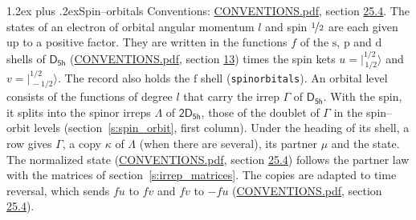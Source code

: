\documentclass[10pt,a4paper]{article}
\makeatletter
\renewcommand\section{\@startsection{section}{1}{\z@}{-3ex plus -1ex minus -.2ex}%
  {1.2ex plus .2ex}{\normalfont\large\sffamily\bfseries\color{parttitle}}}
\numberwithin{equation}{section}
\newcommand{\grp}[1]{\mathsf{#1}}
\newcommand{\orbital}[1]{\mathrm{#1}}
\newcommand{\mult}{\kappa}
\newcommand{\intx}{\mu}
\newcommand{\jm}[2]{\bigl\lvert{}^{#1}_{\,#2}\bigr\rangle}
\makeatother
\begin{document}
\section{Spin--orbitals}\label{s:spin_orbitals}
Conventions: \href{../../CONVENTIONS.pdf}{CONVENTIONS.pdf}, section \href{../../CONVENTIONS.pdf\#conv.25.4}{25.4}.
\leavevmode\label{n:index.orbital.l}The states of an electron of orbital angular momentum $l$ and spin $\nicefrac{1}{2}$ are each given up to a positive factor. \label{n:local.spinor.uv}\label{n:local.function.f}They are written in the functions $f$ of the $\orbital{s}$, $\orbital{p}$ and $\orbital{d}$ shells of \href{../../../rotation/data/pdf/D5h.pdf}{$\grp{D_{5h}}$} (\href{../../CONVENTIONS.pdf}{CONVENTIONS.pdf}, section \href{../../../rotation/CONVENTIONS.pdf\#conv.13}{13}) times the spin kets $u = \jm{1/2}{1/2}$ and $v = \jm{1/2}{-1/2}$. The record also holds the $\orbital{f}$ shell (\texttt{spinorbitals}). An orbital level consists of the functions of degree $l$ that carry the irrep $\Gamma$ of \href{../../../rotation/data/pdf/D5h.pdf}{$\grp{D_{5h}}$}. With the spin, it splits into the spinor irreps $\Lambda$ of $\grp{2D_{5h}}$, those of the doublet of $\Gamma$ in the spin--orbit levels (section~\ref{s:spin_orbit}, first column). \label{n:head.state}Under the heading of its shell, a row gives $\Gamma$, a copy $\mult$ of $\Lambda$ (when there are several), its partner $\intx$ and the state. The normalized state (\href{../../CONVENTIONS.pdf}{CONVENTIONS.pdf}, section \href{../../CONVENTIONS.pdf\#conv.25.4}{25.4}) follows the partner law with the matrices of section~\ref{s:irrep_matrices}. The copies are adapted to time reversal, which sends $f u$ to $f v$ and $f v$ to $-f u$ (\href{../../CONVENTIONS.pdf}{CONVENTIONS.pdf}, section \href{../../CONVENTIONS.pdf\#conv.25.4}{25.4}).
\end{document}
